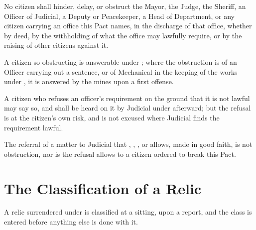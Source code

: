 No citizen shall hinder, delay, or obstruct the Mayor, the Judge, the Sheriff, an Officer of Judicial, a Deputy or Peacekeeper, a Head of Department, or any citizen carrying an office this Pact names, in the discharge of that office, whether by deed, by the withholding of what the office may lawfully require, or by the raising of other citizens against it.

\begin{clauses}
\item A citizen so obstructing is answerable under ; where the obstruction is of an Officer carrying out a sentence, or of Mechanical in the keeping of the works under , it is answered by the mines upon a first offense.
\item A citizen who refuses an officer's requirement on the ground that it is not lawful may say so, and shall be heard on it by Judicial under  afterward; but the refusal is at the citizen's own risk, and is not excused where Judicial finds the requirement lawful.
\item The referral of a matter to Judicial that , , , or  allows, made in good faith, is not obstruction, nor is the refusal  allows to a citizen ordered to break this Pact.
\end{clauses}

\section{The Classification of a Relic}
\label{sec:publicorder:classification-of-a-relic}

A relic surrendered under  is classified at a sitting, upon a report, and the class is entered before anything else is done with it.

